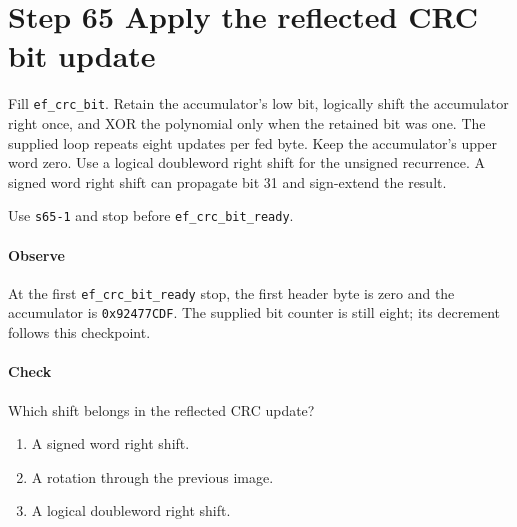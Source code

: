 \section{Step 65 Apply the reflected CRC bit update}
Fill \texttt{ef\_crc\_bit}. Retain the accumulator's low bit, logically shift the accumulator right once, and XOR the polynomial only when the retained bit was one. The supplied loop repeats eight updates per fed byte. Keep the accumulator's upper word zero. Use a logical doubleword right shift for the unsigned recurrence. A signed word right shift can propagate bit 31 and sign-extend the result.

Use \texttt{s65-1} and stop before \texttt{ef\_crc\_bit\_ready}.

\paragraph{Observe} At the first \texttt{ef\_crc\_bit\_ready} stop, the first header byte is zero and the accumulator is \texttt{0x92477CDF}. The supplied bit counter is still eight; its decrement follows this checkpoint.

\paragraph{Check} Which shift belongs in the reflected CRC update?
\begin{enumerate}[label=\Alph*.]
  \item A signed word right shift.
  \item A rotation through the previous image.
  \item A logical doubleword right shift.
\end{enumerate}
